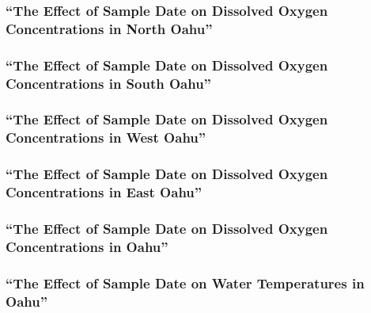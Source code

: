 \documentclass[12pt,]{article}
\begin{document}
\subsubsection{\texorpdfstring{``The Effect of Sample Date on Dissolved
Oxygen Concentrations in North
Oahu''}{The Effect of Sample Date on Dissolved Oxygen Concentrations in North Oahu}}\label{the-effect-of-sample-date-on-dissolved-oxygen-concentrations-in-north-oahu}

\subsubsection{\texorpdfstring{``The Effect of Sample Date on Dissolved
Oxygen Concentrations in South
Oahu''}{The Effect of Sample Date on Dissolved Oxygen Concentrations in South Oahu}}\label{the-effect-of-sample-date-on-dissolved-oxygen-concentrations-in-south-oahu}

\subsubsection{\texorpdfstring{``The Effect of Sample Date on Dissolved
Oxygen Concentrations in West
Oahu''}{The Effect of Sample Date on Dissolved Oxygen Concentrations in West Oahu}}\label{the-effect-of-sample-date-on-dissolved-oxygen-concentrations-in-west-oahu}

\subsubsection{\texorpdfstring{``The Effect of Sample Date on Dissolved
Oxygen Concentrations in East
Oahu''}{The Effect of Sample Date on Dissolved Oxygen Concentrations in East Oahu}}\label{the-effect-of-sample-date-on-dissolved-oxygen-concentrations-in-east-oahu}

\subsubsection{\texorpdfstring{``The Effect of Sample Date on Dissolved
Oxygen Concentrations in
Oahu''}{The Effect of Sample Date on Dissolved Oxygen Concentrations in Oahu}}\label{the-effect-of-sample-date-on-dissolved-oxygen-concentrations-in-oahu}

\subsubsection{\texorpdfstring{``The Effect of Sample Date on Water
Temperatures in
Oahu''}{The Effect of Sample Date on Water Temperatures in Oahu}}\label{the-effect-of-sample-date-on-water-temperatures-in-oahu}
\end{document}
